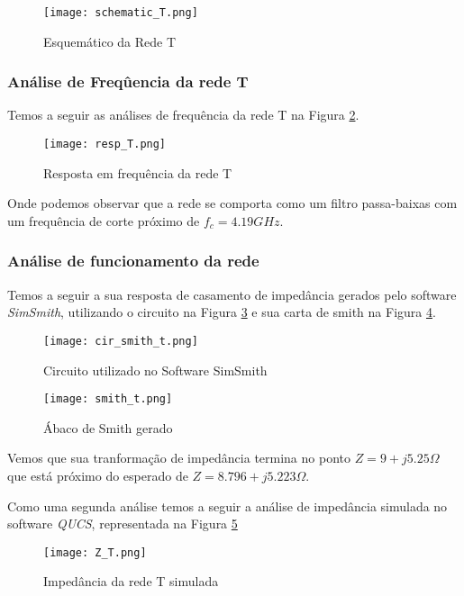 \documentclass[a4paper,12pt]{proc}
\begin{document}
\begin{figure}[htbp]
    \centering
    \texttt{[image: schematic\_T.png]}
    \caption{Esquemático da Rede T}
    \label{schematic_T}
\end{figure}

\subsubsection{Análise de Freqûencia da rede T}

Temos a seguir as análises de frequência da rede T na Figura \ref{resp_T}.

\begin{figure}[htbp]
    \centering
    \texttt{[image: resp\_T.png]}
    \caption{Resposta em frequência da rede T}
    \label{resp_T}
\end{figure}

\noindent Onde podemos observar que a rede se comporta como um filtro passa-baixas com um frequência de corte próximo de $f_{c} = 4.19 GHz$.


\subsubsection{Análise de funcionamento da rede}

Temos a seguir a sua resposta de casamento de impedância gerados pelo software \textit{SimSmith}, utilizando o circuito na Figura \ref{cir_smith_T} e sua carta de smith na Figura \ref{smith_T}.

\begin{figure}[htbp]
    \centering
    \texttt{[image: cir\_smith\_t.png]}
    \caption{Circuito utilizado no Software SimSmith}
    \label{cir_smith_T}
\end{figure}

\begin{figure}[htbp]
    \centering
    \texttt{[image: smith\_t.png]}
    \caption{Ábaco de Smith gerado}
    \label{smith_T}
\end{figure}

\noindent Vemos que sua tranformação de impedância termina no ponto $Z = 9 + j5.25 \Omega$ que está próximo do esperado de $Z = 8.796 + j5.223 \Omega$.

\singlespacing

\noindent Como uma segunda análise temos a seguir a análise de impedância simulada no software \textit{QUCS}, representada na Figura \ref{Z_T}

\begin{figure}[htbp]
    \centering
    \texttt{[image: Z\_T.png]}
    \caption{Impedância da rede T simulada}
    \label{Z_T}
\end{figure}
\end{document}
